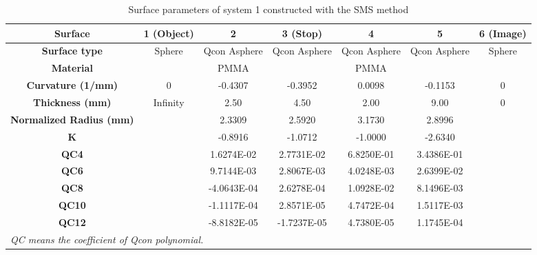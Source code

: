 \setlength{\arrayrulewidth}{.5mm}
\setlength{\tabcolsep}{18pt}
\renewcommand{\arraystretch}{1.2}
\begin{table}[h!]
    \centering
    \captionsetup{justification=centering}
    \caption{Surface parameters of system 1 constructed with the SMS method}
    \label{table: chap5 - sys1 - SMS+OPT}
    \vspace{-1em}
    \begin{adjustbox}{max width=\textwidth, center}
    \begin{tabular}{c c c c c c c}
    \hline 
     \textbf{Surface} & \textbf{1 (Object)} & \textbf{2} & \textbf{3 (Stop)} & \textbf{4} & \textbf{5} & \textbf{6 (Image)}\\ 
     \midrule
    \rowcolor[gray]{0.9}  \textbf{Surface type} & Sphere & Qcon Asphere & Qcon Asphere & Qcon Asphere & Qcon Asphere & Sphere \\ 
    \textbf{Material} &  & PMMA &  & PMMA & & \\
   \rowcolor[gray]{0.9}  \textbf{Curvature (1/mm)} & 0 & -0.4307 & -0.3952 & 0.0098 &-0.1153 & 0\\
    \textbf{Thickness (mm)} & Infinity & 2.50 & 4.50 & 2.00 & 9.00 & 0 \\ 
    \rowcolor[gray]{0.9} \textbf{Normalized Radius (mm)} & & 2.3309 & 2.5920 & 3.1730 & 2.8996 & \\
    \textbf{K} & & -0.8916 & -1.0712 & -1.0000 & -2.6340 &\\
    \rowcolor[gray]{0.9} \textbf{QC4} & &  1.6274E-02 &  2.7731E-02 &  6.8250E-01 &   3.4386E-01 &  \\ 
    \textbf{QC6} & &   9.7144E-03 &  2.8067E-03 &  4.0248E-03 &  2.6399E-02 &\\
   \rowcolor[gray]{0.9}  \textbf{QC8} & & -4.0643E-04 &   2.6278E-04 &   1.0928E-02 &   8.1496E-03 & \\
    \textbf{QC10} & & -1.1117E-04 &   2.8571E-05 &  4.7472E-04 &  1.5117E-03 & \\ 
   \rowcolor[gray]{0.9}  \textbf{QC12} & &  -8.8182E-05 & -1.7237E-05 & 4.7380E-05 &   1.1745E-04 &\\
    \hline
    \multicolumn{6}{l}{\textit{\footnotesize{QC means the coefficient of Qcon polynomial.}}}\\
    \end{tabular}
    \end{adjustbox}
\end{table}

